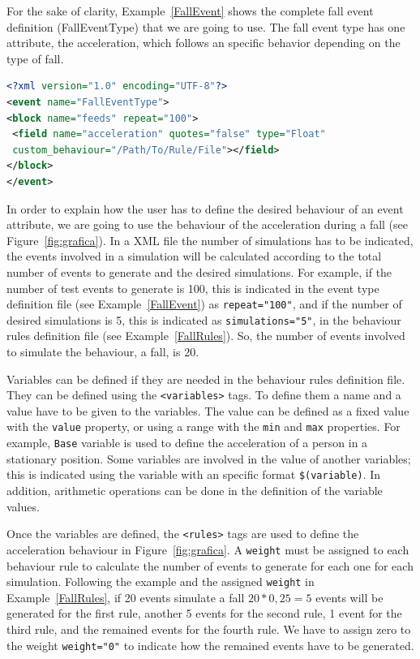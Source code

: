 \documentclass[journal]{IEEEtran}
\begin{document}
For the sake of clarity, Example~\ref{FallEvent} shows the complete fall event definition (FallEventType) that we are going
to use. The fall event type has one attribute, the acceleration, which follows an specific behavior depending on the type of fall.

\begin{lstlisting}[basicstyle=\ttfamily\scriptsize,language=XML,caption={Fall event type definition},label=FallEvent]
<?xml version="1.0" encoding="UTF-8"?>
<event name="FallEventType">
<block name="feeds" repeat="100">
 <field name="acceleration" quotes="false" type="Float" 
 custom_behaviour="/Path/To/Rule/File"></field>
</block>
</event>
\end{lstlisting}

In order to explain how the user has to define the desired behaviour of an event attribute, we are going
to use the behaviour of the acceleration during a fall (see Figure~\ref{fig:grafica}). In a XML file the 
number of simulations has to be indicated, the events involved in a simulation will be calculated according 
to the total number of events to generate and the desired simulations. For example, if the number of test 
events to generate is 100, this is indicated in the event type definition file (see Example~\ref{FallEvent}) as
\texttt{\small{repeat="100"}}, and if the number of desired simulations is 5, this is indicated as \texttt{\small{simulations="5"}}, 
in the behaviour rules definition file (see Example~\ref{FallRules}). So, the number of events 
involved to simulate the behaviour, a fall, is 20. 

Variables can be defined if they are needed in the behaviour rules definition file. They can be defined using 
the \texttt{\small{<variables>}} tags. To define them a name and a value 
have to be given to the variables. The value can be defined as a fixed value with the \texttt{\small{value}} 
property, or using a range with the \texttt{\small{min}} and \texttt{\small{max}} properties. For example, 
\texttt{\small{Base}} variable is used to define the acceleration of a person in a stationary position.
Some variables are involved in the value of another variables; this is indicated using the variable with an specific 
format \texttt{\small{\$(variable)}}. In addition, arithmetic operations can be done in the definition of the variable values. 

Once the variables are defined, the \texttt{\small{<rules>}} tags are used to define the acceleration behaviour in 
Figure~\ref{fig:grafica}. A \texttt{\small{weight}} must be assigned to each behaviour rule to calculate the number 
of events to generate for each one for each simulation.
Following the example and the assigned \texttt{\small{weight}} in Example~\ref{FallRules}, if 20 events simulate 
a fall $20 * 0,25 = 5$ events will be generated for the first rule, another 5 events for the second rule,
1 event for the third rule, and the remained events for the fourth rule. We have to assign zero to the weight
\texttt{\small{weight="0"}} to indicate how the remained events have to be generated. 
\end{document}
